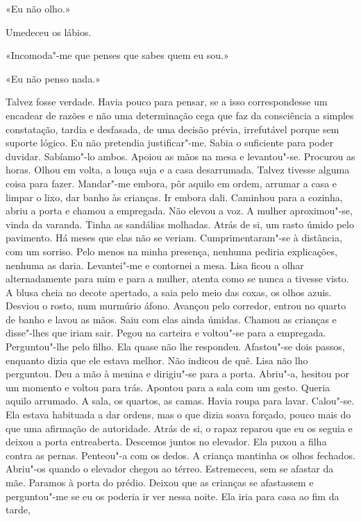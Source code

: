 «Eu não olho.»

Umedeceu os lábios.

«Incomoda"-me que penses que sabes quem eu sou.»

«Eu não penso nada.»

Talvez fosse verdade. Havia pouco para pensar, se a isso correspondesse
um encadear de razões e não uma determinação cega que faz da consciência
a simples constatação, tardia e desfasada, de uma decisão prévia,
irrefutável porque sem suporte lógico. Eu não pretendia justificar"-me.
Sabia o suficiente para poder duvidar. Sabíamo"-lo ambos. Apoiou as mãos
na mesa e levantou"-se. Procurou as horas. Olhou em volta, a louça suja
e a casa desarrumada. Talvez tivesse alguma coisa para fazer. Mandar"-me
embora, pôr aquilo em ordem, arrumar a casa e limpar o lixo, dar banho
às crianças. Ir embora dali. Caminhou para a cozinha, abriu a porta e
chamou a empregada. Não elevou a voz. A mulher aproximou"-se, vinda da
varanda. Tinha as sandálias molhadas. Atrás de si, um rasto úmido pelo
pavimento. Há meses que elas não se veriam. Cumprimentaram"-se à
distância, com um sorriso. Pelo menos na minha presença, nenhuma pediria
explicações, nenhuma as daria. Levantei"-me e contornei a mesa. Lisa
ficou a olhar alternadamente para mim e para a mulher, atenta como se
nunca a tivesse visto. A blusa cheia no decote apertado, a saia pelo
meio das coxas, os olhos azuis. Desviou o rosto, num murmúrio áfono.
Avançou pelo corredor, entrou no quarto de banho e lavou as mãos. Saiu
com elas ainda úmidas. Chamou as crianças e disse"-lhes que iriam sair.
Pegou na carteira e voltou"-se para a empregada. Perguntou"-lhe pelo
filho. Ela quase não lhe respondeu. Afastou"-se dois passos, enquanto
dizia que ele estava melhor. Não indicou de quê. Lisa não lho perguntou.
Deu a mão à menina e dirigiu"-se para a porta. Abriu"-a, hesitou por um
momento e voltou para trás. Apontou para a sala com um gesto. Queria
aquilo arrumado. A sala, os quartos, as camas. Havia roupa para lavar.
Calou"-se. Ela estava habituada a dar ordens, mas o que dizia soava
forçado, pouco mais do que uma afirmação de autoridade. Atrás de si, o
rapaz reparou que eu os seguia e deixou a porta entreaberta. Descemos
juntos no elevador. Ela puxou a filha contra as pernas. Penteou"-a com
os dedos. A criança mantinha os olhos fechados. Abriu"-os quando o
elevador chegou ao térreo. Estremeceu, sem se afastar da mãe.
Paramos à porta do prédio. Deixou que as crianças se afastassem e
perguntou"-me se eu os poderia ir ver nessa noite. Ela iria para casa ao
fim da tarde,

